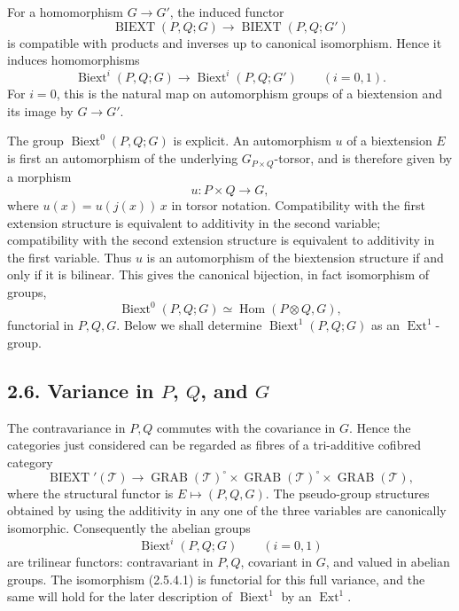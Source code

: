 \documentclass[11pt]{article}
\providecommand{\Ext}{\operatorname{Ext}}
\providecommand{\BIEXT}{\operatorname{BIEXT}}
\providecommand{\Biext}{\operatorname{Biext}}
\providecommand{\GRAB}{\operatorname{GRAB}}
\begin{document}
For a homomorphism \(G\to G'\), the induced functor
\begin{equation}\tag{2.5.3.1}
  \BIEXT(P,Q;G)\longrightarrow\BIEXT(P,Q;G')
\end{equation}
is compatible with products and inverses up to canonical isomorphism.  Hence it induces homomorphisms
\begin{equation}\tag{2.5.3.2}
  \Biext^i(P,Q;G)\longrightarrow\Biext^i(P,Q;G')\qquad (i=0,1).
\end{equation}
For \(i=0\), this is the natural map on automorphism groups of a biextension and its image by \(G\to G'\).

The group \(\Biext^0(P,Q;G)\) is explicit.  An automorphism \(u\) of a biextension \(E\) is first an automorphism of the underlying \(G_{P\times Q}\)-torsor, and is therefore given by a morphism
\begin{equation}\tag{2.5.4.0}
  u:P\times Q\longrightarrow G,
\end{equation}
where \(u(x)=u(j(x))\,x\) in torsor notation.  Compatibility with the first extension structure is equivalent to additivity in the second variable; compatibility with the second extension structure is equivalent to additivity in the first variable.  Thus \(u\) is an automorphism of the biextension structure if and only if it is bilinear.  This gives the canonical bijection, in fact isomorphism of groups,
\begin{equation}\tag{2.5.4.1}
  \Biext^0(P,Q;G)\simeq\operatorname{Hom}(P\otimes Q,G),
\end{equation}
functorial in \(P,Q,G\).  Below we shall determine \(\Biext^1(P,Q;G)\) as an \(\Ext^1\)-group.

\subsection*{2.6. Variance in \(P\), \(Q\), and \(G\)}
The contravariance in \(P,Q\) commutes with the covariance in \(G\).  Hence the categories just considered can be regarded as fibres of a tri-additive cofibred category
\begin{equation}\tag{2.6.1}
  \BIEXT'(\mathcal T)\longrightarrow
  \GRAB(\mathcal T)^\circ\times\GRAB(\mathcal T)^\circ\times\GRAB(\mathcal T),
\end{equation}
where the structural functor is \(E\mapsto(P,Q,G)\).  The pseudo-group structures obtained by using the additivity in any one of the three variables are canonically isomorphic.  Consequently the abelian groups
\begin{equation}\tag{2.6.2}
  \Biext^i(P,Q;G)\qquad (i=0,1)
\end{equation}
are trilinear functors: contravariant in \(P,Q\), covariant in \(G\), and valued in abelian groups.  The isomorphism (2.5.4.1) is functorial for this full variance, and the same will hold for the later description of \(\Biext^1\) by an \(\Ext^1\).
\end{document}
